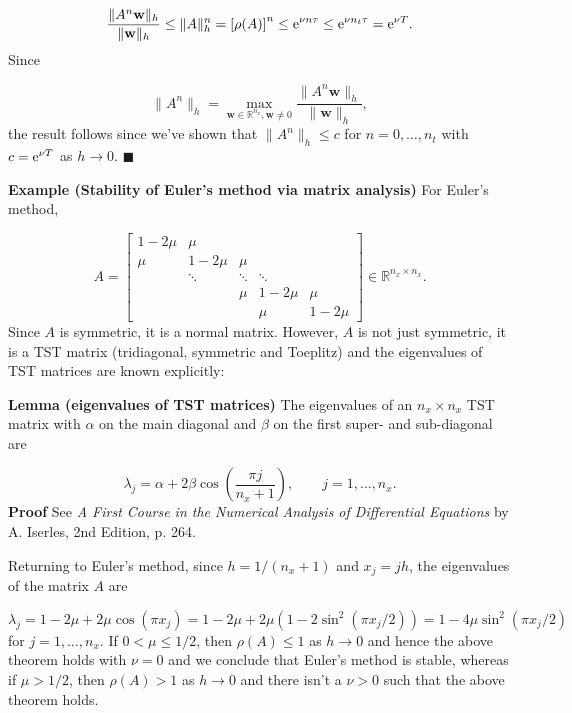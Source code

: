 \documentclass[12pt,landscape]{article}
\begin{document}
{\[
\frac{\| A^n \mathbf{w} \|_h}{\|  \mathbf{w}\|_h} \leq \|A\|_h^{n} = \left[\rho(A)\right]^n \leq {\rm e}^{\nu n\tau}\leq  {\rm e}^{\nu n_t\tau} = {\rm e}^{\nu T}.
\]
Since 

\[
\|A^n \|_h = \max_{\mathbf{w}\in \mathbb{R}^{n_x}, \mathbf{w}\neq 0}\frac{\| A^n \mathbf{w} \|_h}{\|  \mathbf{w}\|_h},
\]
the result follows since we've shown that $\|A^n \|_h \leq c$ for $n = 0, \ldots, n_t$ with $c = {\rm e}^{\nu T}$ as $h \to 0$.  $\blacksquare$

\textbf{Example (Stability of Euler's method via matrix analysis)} For Euler's method, 

\[
 A = \begin{bmatrix}
1 - 2\mu & \mu & & & \\
\mu  & 1-2\mu & \mu  & & \\
      & \ddots & \ddots & \ddots & \\
      &        & \mu    & 1- 2\mu & \mu \\
      &        &        &\mu      & 1-2\mu
\end{bmatrix} \in \mathbb{R}^{n_x \times n_x}.
\]
Since $A$ is symmetric, it is a normal matrix.  However, $A$ is not just symmetric, it is a TST matrix (tridiagonal, symmetric and Toeplitz) and the eigenvalues of TST matrices are known explicitly: 

\textbf{Lemma (eigenvalues of TST matrices)} The eigenvalues of an $n_x \times n_x$ TST matrix with $\alpha$ on the main diagonal and $\beta$ on the first super- and sub-diagonal are

\[
\lambda_j = \alpha + 2\beta\cos\left( \frac{\pi j}{n_x+1}  \right), \qquad j = 1, \ldots, n_x.
\]
\textbf{Proof} See \emph{A First Course in the Numerical Analysis of Differential Equations} by A. Iserles, 2nd Edition, p. 264.

Returning to Euler's method, since $h = 1/(n_x+1)$ and $x_j = jh$, the eigenvalues of the matrix $A$ are

\[
\lambda_j = 1-2\mu + 2\mu\cos(\pi x_j) = 1-2\mu +2\mu(1 - 2\sin^2(\pi x_j/2)) = 1 - 4\mu\sin^2(\pi x_j/2) 
\]
for $j = 1, \ldots, n_x$.  If $0 < \mu \leq 1/2$, then $\rho(A) \leq 1$ as $h \to 0$ and hence the above theorem holds with $\nu = 0$ and we conclude that Euler's method is stable, whereas if $\mu > 1/2$, then $\rho(A) > 1$ as $h \to 0$ and there isn't a $\nu > 0$ such that the above theorem holds.


}
\end{document}
